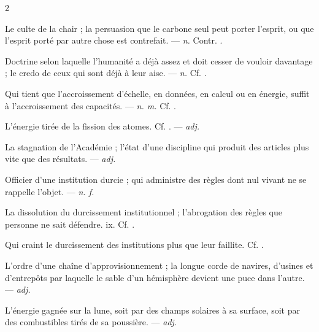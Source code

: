 \begin{multicols}{2}

 Le culte de la chair ; la persuasion que le carbone seul peut porter l'esprit, ou que l'esprit porté par autre chose est contrefait. —  \textit{n.} Contr. .

 Doctrine selon laquelle l'humanité a déjà assez et doit cesser de vouloir davantage ; le credo de ceux qui sont déjà à leur aise. —  \textit{n.} Cf. .

 Qui tient que l'accroissement d'échelle, en données, en calcul ou en énergie, suffit à l'accroissement des capacités. —  \textit{n. m.} Cf. .

 L'énergie tirée de la fission des atomes. Cf. . —  \textit{adj.}

 La stagnation de l'Académie ; l'état d'une discipline qui produit des articles plus vite que des résultats. —  \textit{adj.}

 Officier d'une institution durcie ; qui administre des règles dont nul vivant ne se rappelle l'objet. —  \textit{n. f.}

 La dissolution du durcissement institutionnel ; l'abrogation des règles que personne ne sait défendre.   ix. Cf. .

 Qui craint le durcissement des institutions plus que leur faillite. Cf. .

 L'ordre d'une chaîne d'approvisionnement ; la longue corde de navires, d'usines et d'entrepôts par laquelle le sable d'un hémisphère devient une puce dans l'autre. —  \textit{adj.}

 L'énergie gagnée sur la lune, soit par des champs solaires à sa surface, soit par des combustibles tirés de sa poussière. —  \textit{adj.}


\end{multicols}
